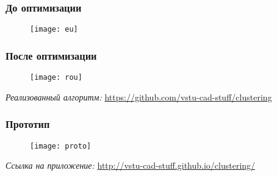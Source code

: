 \begin{frame}
    \frametitle{До оптимизации}
    \begin{figure}
        \center
        \texttt{[image: eu]}
    \end{figure}
\end{frame}

\begin{frame}
    \frametitle{После оптимизации}
    \begin{figure}
        \center
        \texttt{[image: rou]}
    \end{figure}
    \small\emph{Реализованный алгоритм:} \url{https://github.com/vstu-cad-stuff/clustering}
\end{frame}

\begin{frame}
    \frametitle{Прототип}
    \begin{figure}
        \center
        \texttt{[image: proto]}
    \end{figure}
    \small\emph{Ссылка на приложение:} \url{http://vstu-cad-stuff.github.io/clustering/}
\end{frame}
